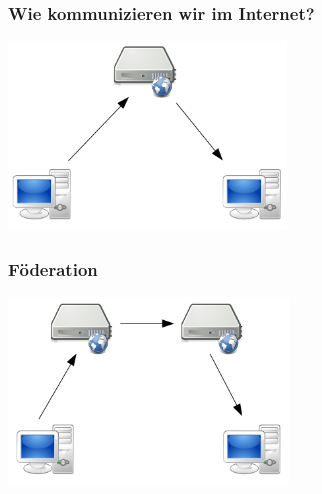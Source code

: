 \begin{frame}
    \frametitle{Wie kommunizieren wir im Internet?}
    \begin{center}
      \includegraphics[height=5cm]{../../img/c-s.png}
    \end{center}
\end{frame}

\begin{frame}
    \frametitle{Föderation}
    \begin{center}
      \includegraphics[height=5cm]{../../img/fed.png}
    \end{center}
\end{frame}
